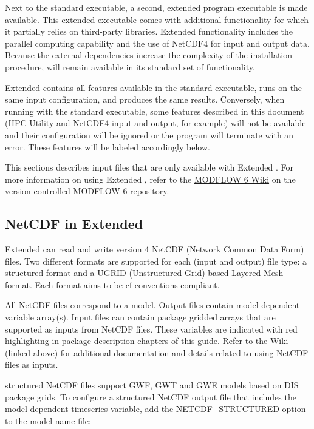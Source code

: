 Next to the standard \mf executable, a second, extended program executable is made available. This extended executable comes with additional functionality for which it partially relies on third-party libraries. Extended functionality includes the parallel computing capability and the use of NetCDF4 for input and output data. Because the external dependencies increase the complexity of the installation procedure, \mf will remain available in its standard set of functionality.

Extended \mf contains all features available in the standard executable, runs on the same input configuration, and produces the same results. Conversely, when running with the standard executable, some features described in this document (HPC Utility and NetCDF4 input and output, for example) will not be available and their configuration will be ignored or the program will terminate with an error. These features will be labeled accordingly below.

This sections describes input files that are only available with Extended \mf.  For more information on using Extended \mf, refer to the \href{https://github.com/MODFLOW-ORG/modflow6/wiki}{MODFLOW 6 Wiki} on the version-controlled \href{https://github.com/MODFLOW-ORG/modflow6}{MODFLOW 6 repository}.

\newpage
\subsection{NetCDF in Extended \mf}
Extended \mf can read and write version 4 NetCDF (Network Common Data Form) files. Two different formats are supported for each (input and output) file type: a structured format and a UGRID (Unstructured Grid) based Layered Mesh format. Each format aims to be cf-conventions compliant.

All \mf NetCDF files correspond to a model. Output files contain model dependent variable array(s). Input files can contain package gridded arrays that are supported as inputs from NetCDF files. These variables are indicated with red highlighting in package description chapters of this guide. Refer to the \mf Wiki (linked above) for additional documentation and details related to using NetCDF files as \mf inputs.

\mf structured NetCDF files support GWF, GWT and GWE models based on DIS package grids. To configure a structured NetCDF output file that includes the model dependent timeseries variable, add the NETCDF\_STRUCTURED option to the model name file:



